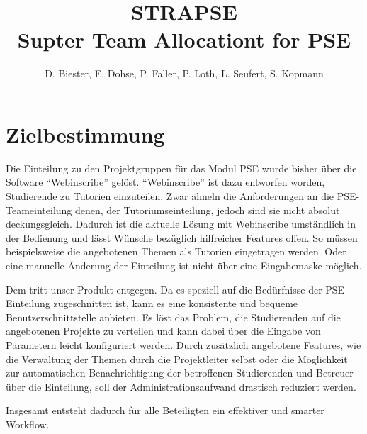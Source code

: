 \documentclass[parskip=full]{scrartcl}
\begin{document}
\title{\textbf{STRA\gls{PSE}}\\
        \large Supter Team Allocationt for \gls{PSE}}

\author{D. Biester, E. Dohse, P. Faller, P. Loth, L. Seufert, S. Kopmann}
        
\maketitle
 
\pagebreak
\tableofcontents
\pagebreak

\section{Zielbestimmung}

Die Einteilung zu den Projektgruppen für das Modul \gls{PSE} wurde
bisher über die Software \enquote{Webinscribe} gelöst.
\enquote{Webinscribe} ist dazu entworfen worden, Studierende zu Tutorien einzuteilen.
Zwar ähneln die Anforderungen an die \gls{PSE}-Teameinteilung denen, der Tutoriumseinteilung,
jedoch sind sie nicht absolut deckungsgleich. 
Dadurch ist die aktuelle Lösung mit Webinscribe umständlich in der Bedienung und lässt Wünsche bezüglich hilfreicher Features offen.
So müssen beispielsweise die angebotenen Themen als Tutorien eingetragen werden. 
Oder eine manuelle Änderung der Einteilung ist nicht über eine Eingabemaske möglich.

Dem tritt unser Produkt entgegen.
Da es speziell auf die Bedürfnisse der \gls{PSE}-Einteilung zugeschnitten ist, 
kann es eine konsistente und bequeme Benutzerschnittstelle anbieten.
Es löst das Problem, die Studierenden auf die angebotenen Projekte zu verteilen und kann dabei über die Eingabe von Parametern leicht konfiguriert werden.
Durch zusätzlich angebotene Features, wie die Verwaltung der Themen durch die Projektleiter selbst 
oder die Möglichkeit zur automatischen Benachrichtigung der betroffenen Studierenden und Betreuer über die
Einteilung, soll der Administrationsaufwand drastisch reduziert werden. 

Insgesamt entsteht dadurch für alle Beteiligten ein effektiver und smarter Workflow.
\end{document}
